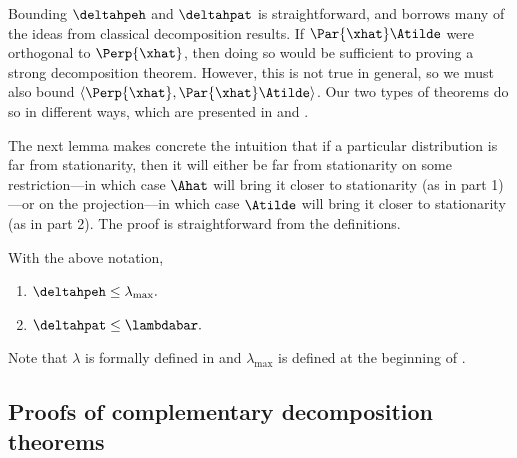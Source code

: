 \documentclass{toc}
\begin{document}
Bounding  $\deltahpeh$ and $\deltahpat$ is straightforward, and borrows 
many of the ideas from classical decomposition results.  If 
$\Par{\xhat}\Atilde$ were orthogonal to $\Perp{\xhat}$, then doing so 
would be sufficient to proving a strong decomposition theorem.  
However, this is not true in general, so we must also bound 
$\langle\Perp{\xhat},\Par{\xhat}\Atilde\rangle$.  Our two types of 
theorems do so in different ways, which are presented in 
 and .

The next lemma makes concrete the intuition that if a particular 
distribution is far from stationarity, then it will either be far from 
stationarity on some restriction---in which case $\Ahat$ will bring it 
closer to stationarity (as in part 1)---or on the projection---in which 
case $\Atilde$ will bring it closer to stationarity (as in part 2).  
The proof is straightforward from the definitions. 

\begin{lemma}\label{lem:eta}
  With the above notation,
\begin{enumerate}
\item $\deltahpeh \leq \lambda_{\max}.$
\item $\deltahpat \leq \lambdabar.$
\end{enumerate}
\end{lemma}
\noindent Note that $\lambda$ is formally defined in  and $\lambda_{\max}$ is defined at the beginning of .

\subsection{Proofs of complementary decomposition theorems}\label{sec:tight}\label{sec:orthog}
\end{document}
